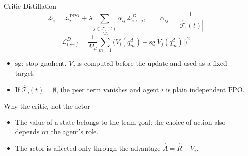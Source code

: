 \documentclass{beamer}
\begin{document}
\begin{frame}{Critic Distillation}
  \small
  \[
    \mathcal{L}_i = \mathcal{L}^{\mathrm{PPO}}_i + \lambda \sum_{j \in \hat{\mathcal{T}}_i(t)} \alpha_{ij}\, \mathcal{L}^{D}_{i \leftarrow j},
    \qquad \alpha_{ij} = \frac{1}{|\hat{\mathcal{T}}_i(t)|}
  \]
  \[
    \mathcal{L}^{D}_{i \leftarrow j} = \frac{1}{M_d} \sum_{m=1}^{M_d} \Big( V_i(q^d_m) - \mathrm{sg}\big[V_j(q^d_m)\big] \Big)^2
  \]

  \begin{itemize}
    \item $\mathrm{sg}$: stop-gradient. $V_j$ is computed before the update and used as a fixed target.
    \item If $\hat{\mathcal{T}}_i(t) = \emptyset$, the peer term vanishes and agent $i$ is plain independent PPO.
  \end{itemize}

  \begin{block}{Why the critic, not the actor}
    \begin{itemize}
      \item The value of a state belongs to the team goal; the choice of action also depends on the agent's role.
      \item The actor is affected only through the advantage $\hat A = \hat R - V_i$.
    \end{itemize}
  \end{block}
\end{frame}
\end{document}
